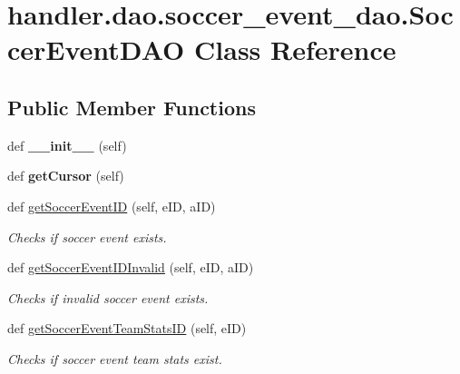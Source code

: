 \hypertarget{classhandler_1_1dao_1_1soccer__event__dao_1_1_soccer_event_d_a_o}{}\section{handler.\+dao.\+soccer\+\_\+event\+\_\+dao.\+Soccer\+Event\+D\+AO Class Reference}
\label{classhandler_1_1dao_1_1soccer__event__dao_1_1_soccer_event_d_a_o}
\subsection*{Public Member Functions}
\begin{DoxyCompactItemize}
\item 
\mbox{\label{classhandler_1_1dao_1_1soccer__event__dao_1_1_soccer_event_d_a_o_a204f4df0eee422721d49ecde8338a216}} 
def {\bfseries \+\_\+\+\_\+init\+\_\+\+\_\+} (self)
\item 
\mbox{\label{classhandler_1_1dao_1_1soccer__event__dao_1_1_soccer_event_d_a_o_a55b786948c2c757d99ad265d7283b7d2}} 
def {\bfseries get\+Cursor} (self)
\item 
def \hyperlink{classhandler_1_1dao_1_1soccer__event__dao_1_1_soccer_event_d_a_o_a44e0dd9fc8e37cb38269659cdb0dc147}{get\+Soccer\+Event\+ID} (self, e\+ID, a\+ID)
\begin{DoxyCompactList}\small\item\em Checks if soccer event exists. \end{DoxyCompactList}\item 
def \hyperlink{classhandler_1_1dao_1_1soccer__event__dao_1_1_soccer_event_d_a_o_a73353319145f82f456e23a65574110ca}{get\+Soccer\+Event\+I\+D\+Invalid} (self, e\+ID, a\+ID)
\begin{DoxyCompactList}\small\item\em Checks if invalid soccer event exists. \end{DoxyCompactList}\item 
def \hyperlink{classhandler_1_1dao_1_1soccer__event__dao_1_1_soccer_event_d_a_o_a9ea8014593e4b0dd7c8e0d815ee9a45f}{get\+Soccer\+Event\+Team\+Stats\+ID} (self, e\+ID)
\begin{DoxyCompactList}\small\item\em Checks if soccer event team stats exist. \end{DoxyCompactList}\item 

\end{DoxyCompactItemize}
